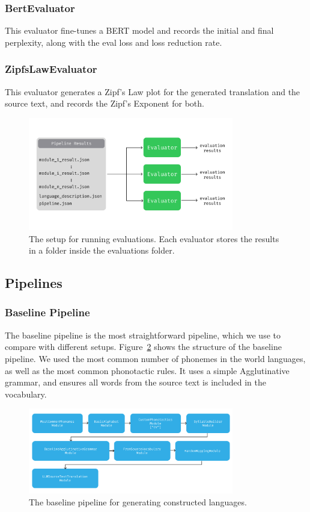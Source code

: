 \subsubsection{BertEvaluator}
This evaluator fine-tunes a BERT model and records the initial and final perplexity, along with the eval loss and loss reduction rate.
\subsubsection{ZipfsLawEvaluator}
This evaluator generates a Zipf's Law plot for the generated translation and the source text, and records the Zipf's Exponent for both.

\begin{figure}
    \centering
    \includegraphics[width=0.8\textwidth]{figures/evaluations_structure.png}
    \caption{The setup for running evaluations. Each evaluator stores the results in a folder inside the evaluations folder.}
    \label{fig:evaluations_structure}
\end{figure}

\subsection{Pipelines}
\subsubsection{Baseline Pipeline}
 The baseline pipeline is the most straightforward pipeline, which we use to compare with different setups. Figure~\ref{fig:baseline_pipeline} 
 shows the structure of the baseline pipeline. We used the most common number of phonemes in the world languages, as well as the most common
 phonotactic rules. It uses a simple Agglutinative grammar, and ensures all words from the source text is included in the vocabulary.
 
\begin{figure}
    \centering
    \includegraphics[width=0.8\textwidth]{figures/baseline_pipeline.png}
    \caption{The baseline pipeline for generating constructed languages.}
    \label{fig:baseline_pipeline}
\end{figure}
